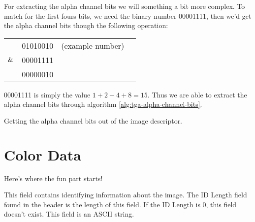 \begin{refsection}

  For extracting the alpha channel bits we will something a bit more
  complex. To match for the first fours bits, we need the binary
  number 00001111, then we'd get the alpha channel bits though the
  following operation:

  \begin{center}
    \begin{tabular}{*{4}{c}}
      & 01010010 & (example number) \\
      $\mathrel{\&}$ & 00001111 & \\
      \cline{1-2}
      &  00000010 \\
    \end{tabular}
  \end{center}

  00001111 is simply the value $1 + 2 + 4 + 8 = 15$. Thus we are able
  to extract the alpha channel bits through algorithm
  \ref{alg:tga-alpha-channel-bits}.

  \begin{algorithm}[H]
    \caption{Getting the alpha channel bits out of the image descriptor.}
    \label{alg:tga-alpha-channel-bits}
    \begin{algorithmic}[1]
    \end{algorithmic}
  \end{algorithm}





  \section{Color Data}
  \label{sec:color-data}

  Here's where the fun part starts!


  This field contains identifying information about the image. The
  ID Length field found in the header is the length of this field. If
  the ID Length is 0, this field doesn't exist. This field is an ASCII
  string.



\end{refsection}
